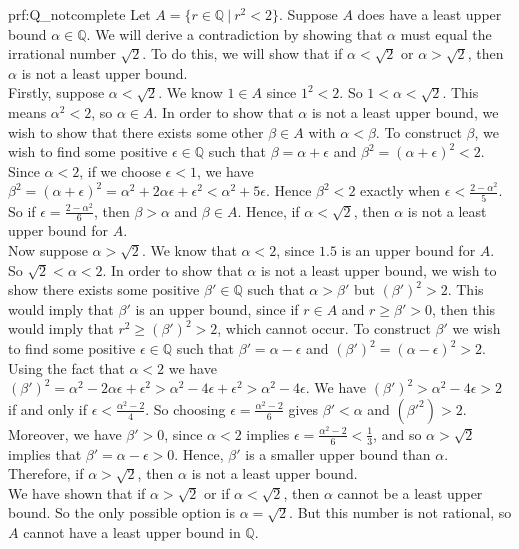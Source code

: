 \begin{prf}{prf:Q_notcomplete} %
Let $A = \{r \in \mathbb{Q} \: | \: r^2 < 2\}$. 
Suppose $A$ does have a least upper bound $\alpha \in \mathbb{Q}$. We will derive a contradiction by showing that $\alpha$ must equal the irrational number $\sqrt{2}$. To do this, we will show that if $\alpha < \sqrt{2}$ or $\alpha > \sqrt{2}$, then $\alpha$ is not a least upper bound. \\

Firstly, suppose $\alpha < \sqrt{2}$. We know $1 \in A$ since $1^2 < 2$. So $1 < \alpha < \sqrt{2}$. This means $\alpha^2 < 2$, so $\alpha \in A$. In order to show that $\alpha$ is not a least upper bound, we wish to show that there exists some other $\beta \in A$ with $\alpha < \beta$.  To construct $\beta$, we wish to find some positive $\epsilon \in \mathbb{Q}$ such that $\beta = \alpha + \epsilon$ and $\beta^2  = (\alpha + \epsilon)^2 < 2$. Since $\alpha<2$, if we choose $\epsilon < 1$, we have $\beta^2  = (\alpha + \epsilon)^2 = \alpha^2 + 2\alpha\epsilon + \epsilon^2 < \alpha^2 + 5\epsilon$. Hence $\beta^2<2$ exactly when $\epsilon < \frac{2 - \alpha^2}{5} $. So if $\epsilon = \frac{2 - \alpha^2}{6}$, then $\beta > \alpha$ and $\beta \in A$. Hence, if $\alpha < \sqrt{2}$, then $\alpha$ is not a least upper bound for $A$.\\

Now suppose $\alpha > \sqrt{2}$. We know that $\alpha < 2$, since $1.5$ is an upper bound for $A$. So $\sqrt{2} < \alpha < 2$. In order to show that $\alpha$ is not a least upper bound, we wish to show there exists some positive $\beta' \in \mathbb{Q}$ such that $\alpha > \beta'$ but $(\beta')^2 > 2$. This would imply that $\beta'$ is an upper bound, since if $r\in A$ and $r\geq\beta'>0$, then this would imply that $r^2\geq(\beta')^2>2$, which cannot occur. To construct $\beta'$ we wish to find some positive $\epsilon \in \mathbb{Q}$ such that $\beta' = \alpha - \epsilon$ and $(\beta')^2 = (\alpha - \epsilon)^2 > 2$. Using the fact that $\alpha < 2$ we have $(\beta')^2 = \alpha^2 - 2\alpha\epsilon + \epsilon^2 > \alpha^2 - 4\epsilon+\epsilon^2 > \alpha^2 - 4\epsilon$. We have $(\beta')^2 >\alpha^2 - 4\epsilon > 2$ if and only if $\epsilon < \frac{\alpha^2-2}{4}$. So choosing $\epsilon = \frac{\alpha^2-2}{6} $ gives $\beta' < \alpha$ and $(\beta'^2) > 2$. Moreover, we have $\beta'>0$, since $\alpha < 2$ implies $\epsilon = \frac{\alpha^2-2}{6}<\frac{1}{3}$, and so $\alpha>\sqrt{2}$ implies that $\beta'=\alpha-\epsilon>0$.  Hence, $\beta'$ is a smaller upper bound than $\alpha$. Therefore, if $\alpha > \sqrt{2}$, then $\alpha$ is not a least upper bound. \\


We have shown that if $\alpha > \sqrt{2}$ or if $\alpha < \sqrt{2}$, then $\alpha$ cannot be a least upper bound. So the only possible option is $\alpha = \sqrt{2}$. But this number is not rational, so $A$ cannot have a least upper bound in $\mathbb{Q}$.
\end{prf} 